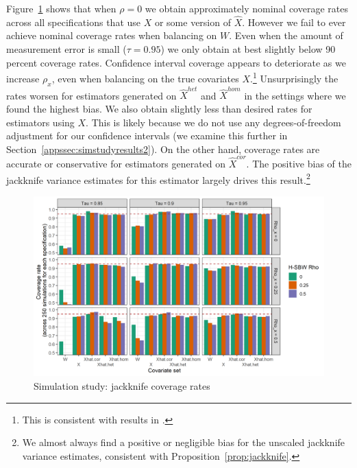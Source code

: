 Figure~\ref{fig:simcoverage1} shows that when $\rho = 0$ we obtain approximately nominal coverage rates across all specifications that use $X$ or some version of $\hat{X}$. However we fail to ever achieve nominal coverage rates when balancing on $W$. Even when the amount of measurement error is small ($\tau = 0.95$) we only obtain at best slightly below 90 percent coverage rates. Confidence interval coverage appears to deteriorate as we increase $\rho_x$, even when balancing on the true covariates $X$.\footnote{This is consistent with results in \cite{cameron2008bootstrap}.} Unsurprisingly the rates worsen for estimators generated on $\hat{X}^{het}$ and $\hat{X}^{hom}$ in the settings where we found the highest bias. We also obtain slightly less than desired rates for estimators using $X$. This is likely because we do not use any degrees-of-freedom adjustment for our confidence intervals (we examine this further in Section~\ref{appssec:simstudyresults2}). On the other hand, coverage rates are accurate or conservative for estimators generated on $\hat{X}^{cor}$. The positive bias of the jackknife variance estimates for this estimator largely drives this result.\footnote{We almost always find a positive or negligible bias for the unscaled jackknife variance estimates, consistent with Proposition~\ref{prop:jackknife}.}

\begin{figure}[H]
\begin{center}
    \caption{Simulation study: jackknife coverage rates}\label{fig:simcoverage1}
    \includegraphics[scale=0.5]{01_Plots/coverage-plot-1.png}
\end{center}
\end{figure}

